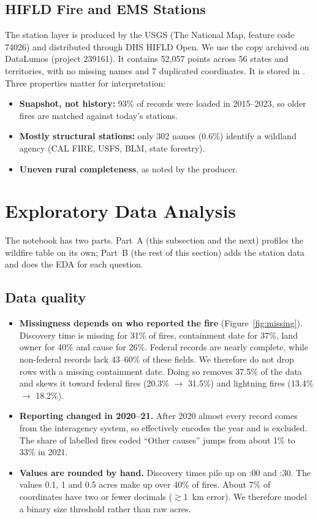 \documentclass[10pt,twocolumn,letterpaper]{article}
\newcommand{\code}[1]{\texttt{\detokenize{#1}}}
\begin{document}
\subsection{HIFLD Fire and EMS Stations}
The station layer \cite{hifld} is produced by the USGS (The National Map, feature code 74026) and distributed through DHS HIFLD Open. We use the copy archived on DataLumos (project 239161). It contains 52{,}057 points across 56 states and territories, with no missing names and 7 duplicated coordinates. It is stored in \code{fire_station_data/}. Three properties matter for interpretation:
\begin{itemize}
\item \textbf{Snapshot, not history:} 93\% of records were loaded in 2015--2023, so older fires are matched against today's stations.
\item \textbf{Mostly structural stations:} only 302 names (0.6\%) identify a wildland agency (CAL FIRE, USFS, BLM, state forestry).
\item \textbf{Uneven rural completeness}, as noted by the producer.
\end{itemize}

\section{Exploratory Data Analysis}
The notebook has two parts. Part~A (this subsection and the next) profiles the wildfire table on its own; Part~B (the rest of this section) adds the station data and does the EDA for each question.

\subsection{Data quality}
\begin{itemize}
\item \textbf{Missingness depends on who reported the fire} (Figure~\ref{fig:missing}). Discovery time is missing for 31\% of fires, containment date for 37\%, land owner for 40\% and cause for 26\%. Federal records are nearly complete, while non-federal records lack 43--60\% of these fields. We therefore do not drop rows with a missing containment date. Doing so removes 37.5\% of the data and skews it toward federal fires (20.3\% $\rightarrow$ 31.5\%) and lightning fires (13.4\% $\rightarrow$ 18.2\%).
\item \textbf{Reporting changed in 2020--21.} After 2020 almost every record comes from the interagency system, so \code{SOURCE_SYSTEM_TYPE} effectively encodes the year and is excluded. The share of labelled fires coded ``Other causes'' jumps from about 1\% to 33\% in 2021.
\item \textbf{Values are rounded by hand.} Discovery times pile up on :00 and :30. The values 0.1, 1 and 0.5 acres make up over 40\% of fires. About 7\% of coordinates have two or fewer decimals ($\gtrsim$1~km error). We therefore model a binary size threshold rather than raw acres.
\end{itemize}
\end{document}
